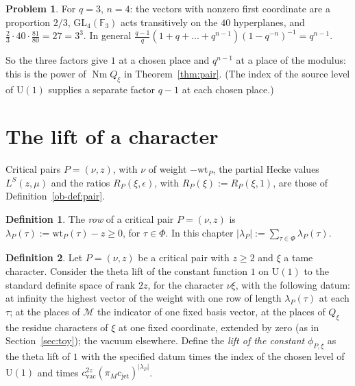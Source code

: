 \documentclass[reqno]{amsart}
\newcounter{chap}
\theoremstyle{definition}
\newtheorem{problem}{Problem}[section]
\newtheorem{definition}{Definition}[section]
\theoremstyle{plain}
\theoremstyle{remark}
\newcommand{\F}{\mathbb{F}}
\newcommand{\Mcal}{\mathcal{M}}
\newcommand{\Nm}{\operatorname{Nm}}
\newcommand{\wt}{\mathrm{wt}}
\newcommand{\cvac}{c_{\mathrm{vac}}}
\newcommand{\cjet}{c_{\mathrm{jet}}}
\begin{document}
\begin{problem}\label{pr:twist-place}
For \(q = 3\), \(n = 4\): the vectors with nonzero first coordinate are a proportion \(2/3\), \(\mathrm{GL}_4(\F_3)\) acts transitively on the \(40\) hyperplanes, and \(\tfrac23\cdot 40\cdot\tfrac{81}{80} = 27 = 3^3\).  In general \(\frac{q-1}{q}(1 + q + \dots + q^{n-1})(1 - q^{-n})^{-1} = q^{n-1}\).
\end{problem}

So the three factors give \(1\) at a chosen place and \(q^{n-1}\) at a place of the modulus: this is the power of \(\Nm Q_\xi\) in Theorem~\ref{thm:pair}.  (The index of the source level of \(\mathrm U(1)\) supplies a separate factor \(q - 1\) at each chosen place.)

\section{The lift of a character}\label{sec:lift}

Critical pairs \(P = (\nu, z)\), with \(\nu\) of weight \(-\wt_P\), the partial Hecke values \(L^S(z, \mu)\) and the ratios \(R_P(\xi, \epsilon)\), with \(R_P(\xi) := R_P(\xi, 1)\), are those of Definition~\ref{ob-def:pair}.

\begin{definition}\label{def:row}
The \emph{row} of a critical pair \(P = (\nu, z)\) is \(\lambda_P(\tau) := \wt_P(\tau) - z \ge 0\), for \(\tau \in \Phi\).  In this chapter \(\lvert\lambda_P\rvert := \sum_{\tau\in\Phi}\lambda_P(\tau)\).
\end{definition}

\begin{definition}\label{def:char-lift}
Let \(P = (\nu, z)\) be a critical pair with \(z \ge 2\) and \(\xi\) a tame character.  Consider the theta lift of the constant function \(1\) on \(\mathrm U(1)\) to the standard definite space of rank \(2z\), for the character \(\nu\xi\), with the following datum: at infinity the highest vector of the weight with one row of length \(\lambda_P(\tau)\) at each \(\tau\); at the places of \(\Mcal\) the indicator of one fixed basis vector, at the places of \(Q_\xi\) the residue characters of \(\xi\) at one fixed coordinate, extended by zero (as in Section~\ref{sec:toy}); the vacuum elsewhere.  Define the \emph{lift of the constant} \(\phi_{P,\xi}\) as the theta lift of \(1\) with the specified datum times the index of the chosen level of \(\mathrm U(1)\) and times \(\cvac^{2z}(\pi_M\cjet)^{\lvert\lambda_P\rvert}\).
\end{definition}
\end{document}
